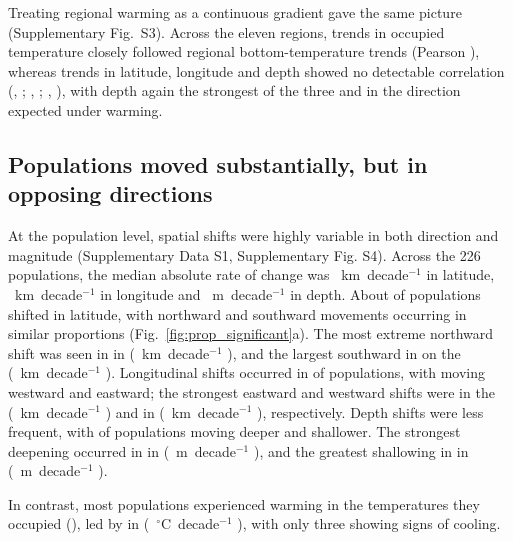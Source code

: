 \documentclass[9pt,twocolumn,twoside]{pnas-new}
\begin{document}
Treating regional warming as a continuous gradient gave the same picture (Supplementary Fig.~S3). Across the eleven regions, trends in occupied temperature closely followed regional bottom-temperature trends (Pearson \CorThermal{}), whereas trends in latitude, longitude and depth showed no detectable correlation (\CorLat{}, \CorLatCI{}; \CorLon{}, \CorLonCI{}; \CorDepth{}, \CorDepthCI{}), with depth again the strongest of the three and in the direction expected under warming.

\subsection*{Populations moved substantially, but in opposing directions}




At the population level, spatial shifts were highly variable in both direction and magnitude (Supplementary Data S1, Supplementary Fig. S4). Across the 226 populations, the median absolute rate of change was \LatMedAbs{}~km~decade$^{-1}$ in latitude, \LonMedAbs{}~km~decade$^{-1}$ in longitude and \DepthMedAbs{}~m~decade$^{-1}$ in depth. About \LatPerc{} of populations shifted in latitude, with northward and southward movements occurring in similar proportions (Fig.~\ref{fig:prop_significant}a). The most extreme northward shift was seen in \MaxLatSpecies{} in \MaxLatRegion{} (\MaxLatMedian{}~km~decade$^{-1}$ \MaxLatCI{}), and the largest southward in \MinLatSpecies{} on the \MinLatRegion{} (\MinLatMedian{}~km~decade$^{-1}$ \MinLatCI{}). Longitudinal shifts occurred in \LonPerc{} of populations, with \LonWestingPerc{} moving westward and \LonEastingPerc{} eastward; the strongest eastward and westward shifts were \MaxLonSpecies{} in the \MaxLonRegion{} (\MaxLonMedian{}~km~decade$^{-1}$ \MaxLonCI{}) and \MinLonSpecies{} in \MinLonRegion{} (\MinLonMedian{}~km~decade$^{-1}$ \MinLonCI{}), respectively. Depth shifts were less frequent, with \DepthDeepeningPerc{} of populations moving deeper and \DepthShallowingPerc{} shallower. The strongest deepening occurred in \MaxDepthSpecies{} in \MaxDepthRegion{} (\MaxDepthMedian{}~m~decade$^{-1}$ \MaxDepthCI{}), and the greatest shallowing in \MinDepthSpecies{} in \MinDepthRegion{} (\MinDepthMedian{}~m~decade$^{-1}$ \MinDepthCI{}).

In contrast, most populations experienced warming in the temperatures they occupied (\ThermalPerc{}), led by \MaxThermalSpecies{} in \MaxThermalRegion{} (\MaxThermalMedian{}~$^\circ$C~decade$^{-1}$ \MaxThermalCI{}), with only three showing signs of cooling.
\end{document}
